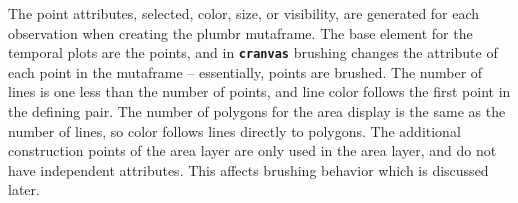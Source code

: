 \documentclass[12pt]{article}
\begin{document}
The point attributes, selected, color, size, or visibility, are generated for each observation when creating the plumbr mutaframe. The base element for the temporal plots are the points, and in \texttt{\textbf{cranvas}} brushing changes the attribute of each point in the mutaframe -- essentially, points are brushed. The number of lines is one less than the number of points, and line color follows the first point in the defining pair. The number of polygons for the area display is the same as the number of lines, so color follows lines directly to polygons. The additional construction points of the area layer are only used in the area layer, and do not have independent attributes. This affects brushing behavior which is discussed later.



\end{document}
